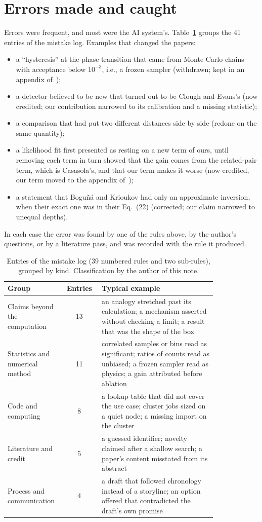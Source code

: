 \documentclass[11pt,a4paper]{article}
\begin{document}
\section{Errors made and caught}
Errors were frequent, and most were the AI system's. Table~\ref{tab:mistakes} groups the 41 entries of the mistake log. Examples that changed the papers:
\begin{itemize}[itemsep=1pt]
\item a ``hysteresis'' at the phase transition that came from Monte Carlo chains with acceptance below $10^{-3}$, i.e., a frozen sampler (withdrawn; kept in an appendix of~\cite{Toolkit});
\item a detector believed to be new that turned out to be Clough and Evans's (now credited; our contribution narrowed to its calibration and a missing statistic);
\item a comparison that had put two different distances side by side (redone on the same quantity);
\item a likelihood fit first presented as resting on a new term of ours, until removing each term in turn showed that the gain comes from the related-pair term, which is Casasola's, and that our term makes it worse (now credited, our term moved to the appendix of~\cite{Embedding});
\item a statement that Bogu\~n\'a and Krioukov had only an approximate inversion, when their exact one was in their Eq.~(22) (corrected; our claim narrowed to unequal depths).
\end{itemize}
In each case the error was found by one of the rules above, by the author's questions, or by a literature pass, and was recorded with the rule it produced.

\begin{table}[h]
\centering\small
\begin{tabular}{@{}p{0.27\linewidth}cp{0.55\linewidth}@{}}
\toprule
Group & Entries & Typical example \\
\midrule
Claims beyond the computation & 13 & an analogy stretched past its calculation; a mechanism asserted without checking a limit; a result that was the shape of the box \\
Statistics and numerical method & 11 & correlated samples or bins read as significant; ratios of counts read as unbiased; a frozen sampler read as physics; a gain attributed before ablation \\
Code and computing & 8 & a lookup table that did not cover the use case; cluster jobs sized on a quiet node; a missing import on the cluster \\
Literature and credit & 5 & a guessed identifier; novelty claimed after a shallow search; a paper's content misstated from its abstract \\
Process and communication & 4 & a draft that followed chronology instead of a storyline; an option offered that contradicted the draft's own promise \\
\bottomrule
\end{tabular}
\caption{Entries of the mistake log (39 numbered rules and two sub-rules), grouped by kind. Classification by the author of this note.}\label{tab:mistakes}
\end{table}
\end{document}
